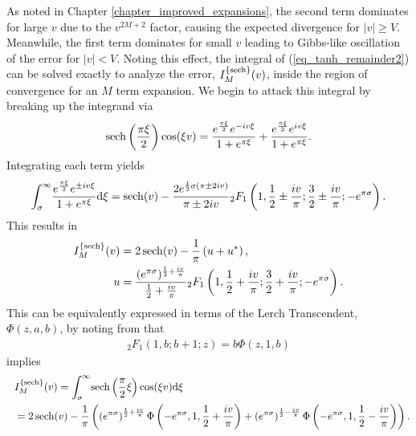 As noted in Chapter \ref{chapter_improved_expansions}, the second term dominates
for large $v$ due to the $v^{2M+2}$ factor, causing the expected divergence
for $|v| \geq V$.  Meanwhile, the first term dominates for small $v$ leading
to Gibbs-like oscillation of the error for $|v| < V$.  Noting this effect,
the integral of (\ref{eq_tanh_remainder2}) can be solved exactly to analyze the
error, $I_M^{\{\operatorname{sech}\}}(v)$, inside the region of convergence for
an $M$ term expansion.  We begin to attack this integral by breaking up the integrand via
\begin{align}
	\operatorname{sech}\left(\frac{\pi \xi}{2}\right)\cos(\xi v) = 
	\frac{e^{\frac{\pi\xi}{2}} e^{-iv\xi}}{1 + e^{\pi \xi}}
	+
	\frac{e^{\frac{\pi\xi}{2}} e^{iv\xi}}{1 + e^{\pi \xi}}.
\end{align}
Integrating each term yields
\begin{align}
	\int_\sigma^\infty \! \frac{e^{\frac{\pi\xi}{2}} e^{\pm iv\xi}}{1 + e^{\pi \xi}} \mathrm{d}\xi
	= \operatorname{sech}(v) - \frac{2 e^{\frac{1}{2}\sigma(\pi \pm 2iv)}}{\pi \pm 2iv}
	{}_{2}F_{1}\left(1, \frac{1}{2} \pm \frac{iv}{\pi}; \frac{3}{2} \pm \frac{iv}{\pi}; -e^{\pi\sigma}\right).
\end{align}
This results in
\begin{align}
	I_M^{\{\operatorname{sech}\}}(v) &= 2 \operatorname{sech}(v) - \frac{1}{\pi}\left(u + u^*\right), \\
	u &= \frac{(e^{\pi\sigma})^{\frac{1}{2} + \frac{iv}{\pi}}}{\frac{1}{2} + \frac{iv}{\pi}}
	{}_{2}F_{1}\left(1, \frac{1}{2} + \frac{iv}{\pi}; \frac{3}{2} + \frac{iv}{\pi}; -e^{\pi \sigma}\right).
\end{align}
This can be equivalently expressed in terms of the Lerch Transcendent, $\Phi(z, a, b)$, by noting
from \cite{prudnikov_integrals_2003} that
\begin{align}
	{}_{2}F_{1}\left(1, b; b+1; z\right) = b \Phi(z, 1, b)
\end{align}
implies
\begin{gather}
	\begin{split}
		&I_M^{\{\operatorname{sech}\}}(v) = \int_\sigma^{\infty} \!
		\operatorname{sech}\left(\frac{\pi}{2}\xi\right)
		\cos(\xi v) \mathrm{d}\xi \\
		\ \ &= 2 \operatorname{sech}(v)
		- \frac{1}{\pi}\left(
		\left( e^{\pi\sigma}\right)^{\frac{1}{2} + \frac{iv}{\pi}}
		\Phi\left(-e^{\pi \sigma}, 1, \frac{1}{2} + \frac{iv}{\pi}\right)
		+
		\left( e^{\pi\sigma}\right)^{\frac{1}{2} - \frac{iv}{\pi}}
		\Phi\left(-e^{\pi \sigma}, 1, \frac{1}{2} - \frac{iv}{\pi}\right)
		\right).
	\end{split}
\end{gather}
